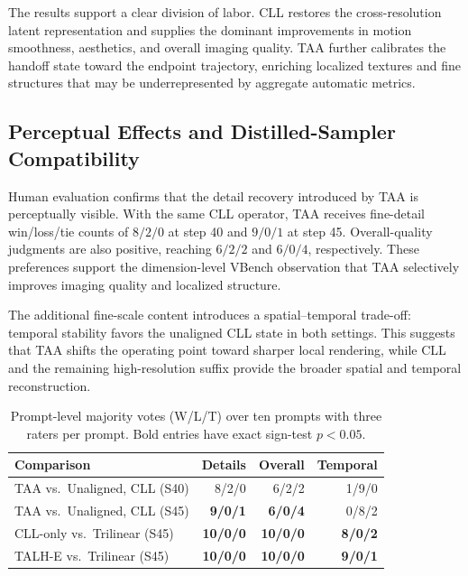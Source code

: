 The results support a clear division of labor. CLL restores the
cross-resolution latent representation and supplies the dominant
improvements in motion smoothness, aesthetics, and overall imaging
quality. TAA further calibrates the handoff state toward the endpoint
trajectory, enriching localized textures and fine structures that may
be underrepresented by aggregate automatic metrics.

\subsection{Perceptual Effects and Distilled-Sampler Compatibility}

Human evaluation confirms that the detail recovery introduced by TAA is
perceptually visible. With the same CLL operator, TAA receives
fine-detail win/loss/tie counts of \(8/2/0\) at step 40 and \(9/0/1\)
at step 45. Overall-quality judgments are also positive, reaching
\(6/2/2\) and \(6/0/4\), respectively. These preferences support the
dimension-level VBench observation that TAA selectively improves
imaging quality and localized structure.

The additional fine-scale content introduces a spatial--temporal
trade-off: temporal stability favors the unaligned CLL state in both
settings. This suggests that TAA shifts the operating point toward
sharper local rendering, while CLL and the remaining high-resolution
suffix provide the broader spatial and temporal reconstruction.

\begin{table}[!t]
\centering
\footnotesize
\setlength{\tabcolsep}{2pt}
\begin{tabular}{lrrr}
\toprule
Comparison & Details & Overall & Temporal \\
\midrule
TAA vs.\ Unaligned, CLL (S40) & 8/2/0 & 6/2/2 & 1/9/0 \\
TAA vs.\ Unaligned, CLL (S45) &
\textbf{9/0/1} & \textbf{6/0/4} & 0/8/2 \\
CLL-only vs.\ Trilinear (S45) &
\textbf{10/0/0} & \textbf{10/0/0} & \textbf{8/0/2} \\
TALH-E vs.\ Trilinear (S45) &
\textbf{10/0/0} & \textbf{10/0/0} & \textbf{9/0/1} \\
\bottomrule
\end{tabular}
\caption{Prompt-level majority votes (W/L/T) over ten prompts with three
raters per prompt. Bold entries have exact sign-test \(p<0.05\).}
\label{tab:human}
\end{table}

